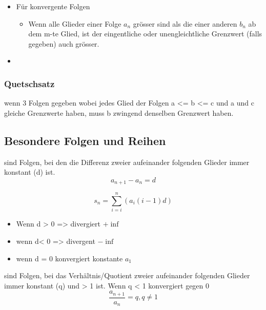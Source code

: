 \begin{itemize}
    \item Für konvergente Folgen
    \begin{itemize}
\item Wenn alle Glieder einer Folge $a_n$ grösser sind als die einer anderen $b_n$ ab dem m-te Glied, ist der eingentliche oder unengleichtliche Grenzwert (falls gegeben) auch grösser.
    \end{itemize}
    \item 
\end{itemize}

\subsubsection{Quetschsatz}

\begin{theorem}
    [Quetschsatz] wenn 3 Folgen gegeben wobei jedes Glied der Folgen a <= b <= c und a und c gleiche Grenzwerte haben, muss b zwingend denselben Grenzwert haben.
\end{theorem}

\subsection{Besondere Folgen und Reihen}
\begin{definition}
     sind Folgen, bei den die Differenz zweier aufeinander folgenden Glieder immer konstant (d) ist.
    \begin{equation}
        a_{n+1} - a_n = d
    \end{equation}
\end{definition}

\begin{definition}
    \begin{equation}
        s_n = \sum_{i=i}^{n} (a_i (i - 1) d) 
    \end{equation}
    \begin{itemize}
        \item Wenn d > 0 => divergiert $+ \inf$
        \item wenn d< 0 => divergent $- \inf$
        \item wenn d = 0 konvergiert konstante $a_1$
    \end{itemize}
\end{definition}

\begin{definition}
     sind Folgen, bei das Verhältnis/Quotient zweier aufeinander folgenden Glieder immer konstant (q) und > 1 ist. Wenn q < 1 konvergiert gegen 0
    \begin{equation}
        \frac{a_{n+1}}{a_n} = q, q\neq 1    
    \end{equation}
\end{definition}


